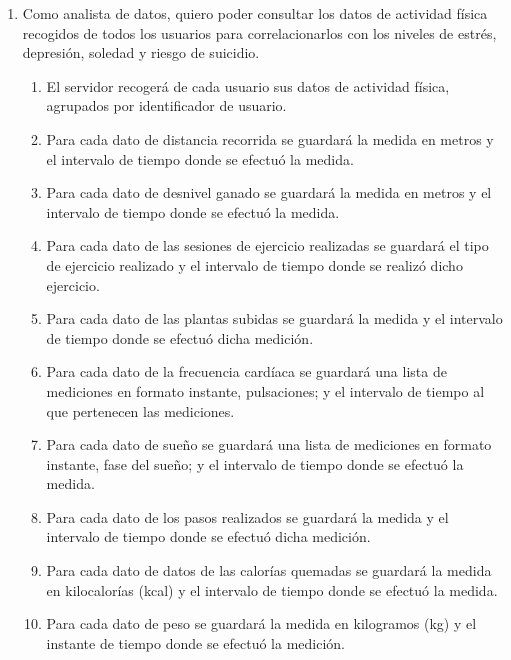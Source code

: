         \begin{enumerate}[resume=req-usuario,label=\textbf{\texttt{RU-\arabic*}}]
            \item Como analista de datos, quiero poder consultar los datos de actividad física recogidos de todos los usuarios para correlacionarlos con los niveles de estrés, depresión, soledad y riesgo de suicidio.
            \begin{enumerate}[resume=req-funcionales,label=\textbf{\texttt{RF-\arabic*}}]
                \item El servidor recogerá de cada usuario sus datos de actividad física, agrupados por identificador de usuario.
                \item Para cada dato de distancia recorrida se guardará la medida en metros y el intervalo de tiempo donde se efectuó la medida.
                \item Para cada dato de desnivel ganado se guardará la medida en metros y el intervalo de tiempo donde se efectuó la medida.
                \item Para cada dato de las sesiones de ejercicio realizadas se guardará el tipo de ejercicio realizado y el intervalo de tiempo donde se realizó dicho ejercicio.
                \item Para cada dato de las plantas subidas se guardará la medida y el intervalo de tiempo donde se efectuó dicha medición.
                \item Para cada dato de la frecuencia cardíaca se guardará una lista de mediciones en formato instante, pulsaciones; y el intervalo de tiempo al que pertenecen las mediciones.
                \item Para cada dato de sueño se guardará una lista de mediciones en formato instante, fase del sueño; y el intervalo de tiempo donde se efectuó la medida.
                \item Para cada dato de los pasos realizados se guardará la medida y el intervalo de tiempo donde se efectuó dicha medición.
                \item Para cada dato de datos de las calorías quemadas se guardará la medida en kilocalorías (kcal) y el intervalo de tiempo donde se efectuó la medida.
                \item Para cada dato de peso se guardará la medida en kilogramos (kg) y el instante de tiempo donde se efectuó la medición.
            \end{enumerate}
        \end{enumerate}
        
